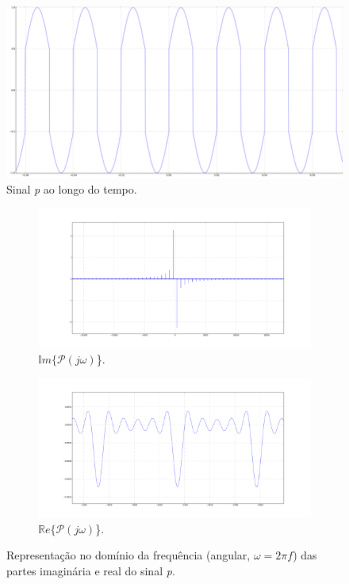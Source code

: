 \begin{figure}[ht]
    \centering
    \includegraphics[width = 0.5\linewidth]{prints/sinal_p.png}   
    \caption{Sinal \textit{p} ao longo do tempo.}
    \label{fig:sinal_p}
\end{figure}

\begin{figure}[ht] 
    \begin{subfigure}[b]{0.5\linewidth}
        \centering
        \includegraphics[width=1\linewidth]{prints/P_imag.png}
        \caption{\(\mathbb{I}m \{\mathcal{P}(j\omega)\)\}.} 
        \label{fig:P_imag} 
    \end{subfigure}%
    \begin{subfigure}[b]{0.5\linewidth}
        \centering
        \includegraphics[width=1\linewidth]{prints/P_real.png} 
        \caption{\(\mathbb{R}e \{\mathcal{P}(j\omega)\)\}.} 
        \label{fig:P_real} 
    \end{subfigure} 
    \caption{Representação no domínio da frequência (angular, \(\omega = 2\pi f\)) das partes imaginária e real do sinal \textit{p}.}
    \label{fig:multiplas_5}
\end{figure}

